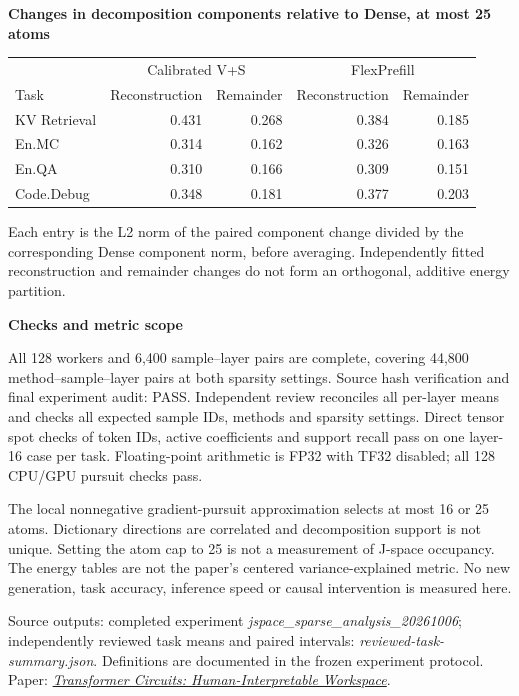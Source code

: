\documentclass[10pt]{article}
\begin{document}
\textbf{Changes in decomposition components relative to Dense, at most 25 atoms}
\begin{center}\begin{tabular}{lrrrr}\toprule
& \multicolumn{2}{c}{Calibrated V+S} & \multicolumn{2}{c}{FlexPrefill}\\
Task & Reconstruction & Remainder & Reconstruction & Remainder\\\midrule
KV Retrieval & 0.431 & 0.268 & 0.384 & 0.185 \\
En.MC & 0.314 & 0.162 & 0.326 & 0.163 \\
En.QA & 0.310 & 0.166 & 0.309 & 0.151 \\
Code.Debug & 0.348 & 0.181 & 0.377 & 0.203 \\
\bottomrule\end{tabular}\end{center}
Each entry is the L2 norm of the paired component change divided by the corresponding Dense component norm, before averaging. Independently fitted reconstruction and remainder changes do not form an orthogonal, additive energy partition.

\textbf{Checks and metric scope}

All 128 workers and 6,400 sample--layer pairs are complete, covering 44,800 method--sample--layer pairs at both sparsity settings. Source hash verification and final experiment audit: PASS. Independent review reconciles all per-layer means and checks all expected sample IDs, methods and sparsity settings. Direct tensor spot checks of token IDs, active coefficients and support recall pass on one layer-16 case per task. Floating-point arithmetic is FP32 with TF32 disabled; all 128 CPU/GPU pursuit checks pass.

The local nonnegative gradient-pursuit approximation selects at most 16 or 25 atoms. Dictionary directions are correlated and decomposition support is not unique. Setting the atom cap to 25 is not a measurement of J-space occupancy. The energy tables are not the paper's centered variance-explained metric. No new generation, task accuracy, inference speed or causal intervention is measured here.

Source outputs: completed experiment \textit{jspace\_sparse\_analysis\_20261006}; independently reviewed task means and paired intervals: \textit{reviewed-task-summary.json}. Definitions are documented in the frozen experiment protocol. Paper: \href{https://transformer-circuits.pub/2026/workspace/index.html}{\textit{Transformer Circuits: Human-Interpretable Workspace}}.
\clearpage
\end{document}
